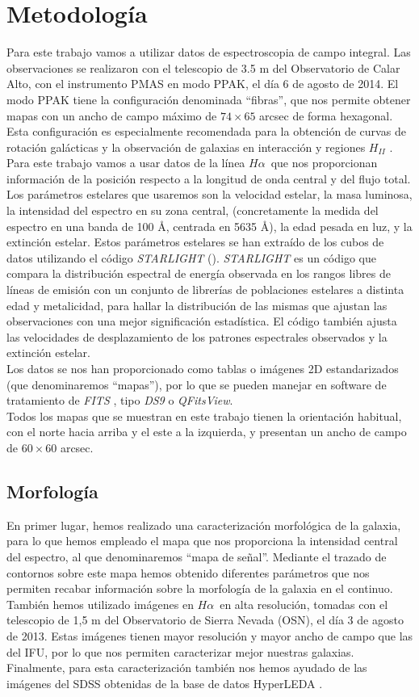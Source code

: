 \documentclass{article}
\newcommand{\hal}{$H\alpha$}
\begin{document}
\section{Metodología}
Para este trabajo vamos a utilizar datos de espectroscopia de campo integral. Las observaciones se realizaron con el telescopio de 3.5 m del Observatorio de Calar Alto, con el instrumento PMAS  en modo PPAK, el día 6 de agosto de 2014. El modo PPAK tiene la configuración denominada ``fibras'', que nos permite obtener mapas con un ancho de campo máximo de $74 \times 65$ arcsec de forma hexagonal. Esta configuración es especialmente recomendada para la obtención de curvas de rotación galácticas y la observación de galaxias en interacción y regiones $H_{II}$ \cite{Barden}.\\Para este trabajo vamos a usar datos de la línea \hal\ que nos proporcionan información de la posición respecto a la longitud de onda central y del flujo total. Los parámetros estelares que usaremos son la velocidad estelar, la masa luminosa, la intensidad del espectro en su zona central, (concretamente la medida del espectro en una banda de 100 \r{A}, centrada en 5635 \r{A}), la edad pesada en luz, y la extinción estelar. Estos parámetros estelares se han extraído de los cubos de datos utilizando el código \emph{STARLIGHT} (\cite{Fernandes2005}). \emph{STARLIGHT} es un código que compara la distribución espectral de energía observada en los rangos libres de líneas de emisión con un conjunto de librerías de poblaciones estelares a distinta edad y metalicidad, para hallar la distribución de las mismas que ajustan las observaciones con una mejor significación estadística. El código también ajusta las velocidades de desplazamiento de los patrones espectrales observados y la extinción estelar.\\Los datos se nos han proporcionado como tablas o imágenes 2D estandarizados (que denominaremos ``mapas''), por lo que se pueden manejar en software de tratamiento de \emph{FITS} , tipo \emph{DS9} o \emph{QFitsView}.\\Todos los mapas que se muestran en este trabajo tienen la orientación habitual, con el norte hacia arriba y el este a la izquierda, y presentan un ancho de campo de $60 \times 60$ arcsec.
\subsection{Morfología}
En primer lugar, hemos realizado una caracterización morfológica de la galaxia, para lo que hemos empleado el mapa que nos proporciona la intensidad central del espectro, al que denominaremos ``mapa de señal''. Mediante el trazado de contornos sobre este mapa hemos obtenido diferentes parámetros que nos permiten recabar información sobre la morfología de la galaxia en el continuo. También hemos utilizado imágenes en \hal\ en alta resolución, tomadas con el telescopio de 1,5 m del Observatorio de Sierra Nevada (OSN), el día 3 de agosto de 2013. Estas imágenes tienen mayor resolución y mayor ancho de campo que las del IFU, por lo que nos permiten caracterizar mejor nuestras galaxias. Finalmente, para esta caracterización también nos hemos ayudado de las imágenes del SDSS obtenidas de la base de datos HyperLEDA \cite{Makarov2014}.
\end{document}
